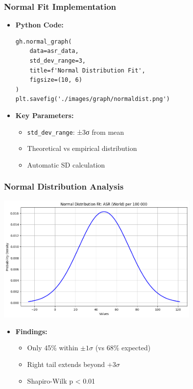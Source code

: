 \documentclass{beamer}
\begin{document}
\begin{frame}[fragile]
    \frametitle{Normal Fit Implementation}
    \begin{itemize}
        \item \textbf{Python Code:}
        \begin{lstlisting}
gh.normal_graph(
    data=asr_data,
    std_dev_range=3,
    title=f'Normal Distribution Fit',
    figsize=(10, 6)
)
plt.savefig('./images/graph/normaldist.png')
        \end{lstlisting}
        
        \item \textbf{Key Parameters:}
        \begin{itemize}
            \item \texttt{std\_dev\_range}: ±3σ from mean
            \item Theoretical vs empirical distribution
            \item Automatic SD calculation
        \end{itemize}
    \end{itemize}
\end{frame}

\begin{frame}
    \frametitle{Normal Distribution Analysis}
    \centering
    \includegraphics[width=0.75\textwidth,height=0.6\textheight,keepaspectratio]{./images/graph/normaldist.png}
    \vspace{-0.5em}  %
    \begin{itemize}
        \item \textbf{Findings:}
        \begin{itemize}
            \item Only 45\% within $\pm1\sigma$ (vs 68\% expected)
            \item Right tail extends beyond $+3\sigma$
            \item Shapiro-Wilk p < 0.01
        \end{itemize}
    \end{itemize}
\end{frame}
\end{document}
